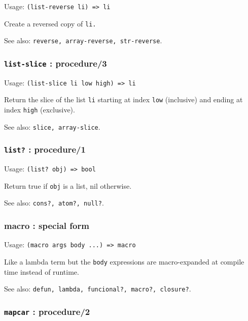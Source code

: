 \documentclass[
]{article}
\newcommand{\passthrough}[1]{#1}
\begin{document}
Usage: \passthrough{\lstinline!(list-reverse li) => li!}

Create a reversed copy of \passthrough{\lstinline!li.!}

See also: \passthrough{\lstinline!reverse, array-reverse, str-reverse!}.

\hypertarget{list-slice-procedure3}{%
\subsubsection{\texorpdfstring{\texttt{list-slice} :
procedure/3}{list-slice : procedure/3}}\label{list-slice-procedure3}}

Usage: \passthrough{\lstinline!(list-slice li low high) => li!}

Return the slice of the list \passthrough{\lstinline!li!} starting at
index \passthrough{\lstinline!low!} (inclusive) and ending at index
\passthrough{\lstinline!high!} (exclusive).

See also: \passthrough{\lstinline!slice, array-slice!}.

\hypertarget{list-procedure1}{%
\subsubsection{\texorpdfstring{\texttt{list?} :
procedure/1}{list? : procedure/1}}\label{list-procedure1}}

Usage: \passthrough{\lstinline!(list? obj) => bool!}

Return true if \passthrough{\lstinline!obj!} is a list, nil otherwise.

See also: \passthrough{\lstinline!cons?, atom?, null?!}.

\hypertarget{macro-special-form}{%
\subsubsection{macro : special form}\label{macro-special-form}}

Usage: \passthrough{\lstinline!(macro args body ...) => macro!}

Like a lambda term but the \passthrough{\lstinline!body!} expressions
are macro-expanded at compile time instead of runtime.

See also:
\passthrough{\lstinline!defun, lambda, funcional?, macro?, closure?!}.

\hypertarget{mapcar-procedure2}{%
\subsubsection{\texorpdfstring{\texttt{mapcar} :
procedure/2}{mapcar : procedure/2}}\label{mapcar-procedure2}}
\end{document}

